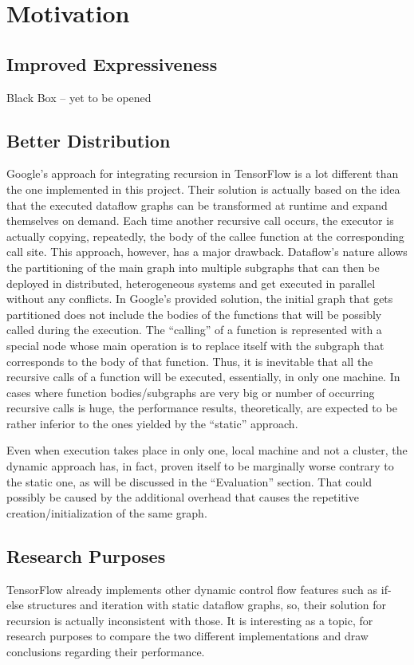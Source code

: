 \documentclass[ack,preface]{dithesis}
\begin{document}
    \section{Motivation}

    \subsection{Improved Expressiveness}
	Black Box – yet to be opened

    \subsection{Better Distribution}
	Google’s approach for integrating recursion in TensorFlow is a lot different than the one implemented in this project. Their solution is actually based on the idea that the executed dataflow graphs can be transformed at runtime and expand themselves on demand. Each time another recursive call occurs, the executor is actually copying, repeatedly, the body of the callee function at the corresponding call site. This approach, however, has a major drawback. Dataflow’s nature allows the partitioning of the main graph into multiple subgraphs that can then be deployed in distributed, heterogeneous systems and get executed in parallel without any conflicts. In Google’s provided solution, the initial graph that gets partitioned does not include the bodies of the functions that will be possibly called during the execution. The “calling” of a function is represented with a special node whose main operation is to replace itself with the subgraph that corresponds to the body of that function. Thus, it is inevitable that all the recursive calls of a function will be executed, essentially, in only one machine.  In cases where function bodies/subgraphs are very big or number of occurring recursive calls is huge, the performance results, theoretically, are expected to be rather inferior to the ones yielded by the “static” approach.

Even when execution takes place in only one, local machine and not a cluster, the dynamic approach has, in fact, proven itself to be marginally worse contrary to the static one, as will be discussed in the “Evaluation” section. That could possibly be caused by the additional overhead that causes the repetitive creation/initialization of the same graph.


    \subsection{Research Purposes}
	TensorFlow already implements other dynamic control flow features such as if-else structures and iteration with static dataflow graphs, so, their solution for recursion is actually inconsistent with those. It is interesting as a topic, for research purposes to compare the two different implementations and draw conclusions regarding their performance. 
\end{document}
